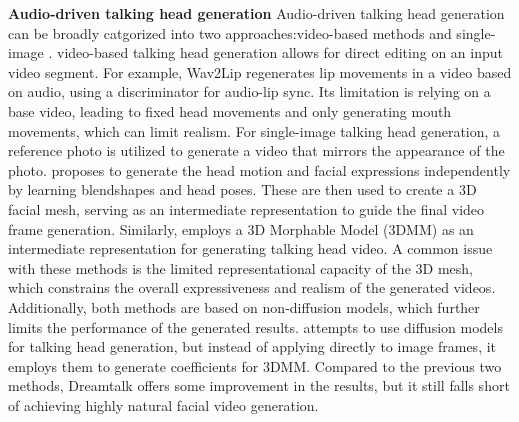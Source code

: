 \documentclass[runningheads]{llncs}
\begin{document}
\textbf{Audio-driven talking head generation}
Audio-driven talking head generation can be broadly catgorized into two approaches:video-based methods\cite{wen2020audiodvp,faceformer2022, wav2lip, shen2023difftalk, guan2023stylesync} and single-image \cite{sadtalker,sun2023vividtalk,dreamtalk, liu2023moda}.
video-based talking head generation allows for direct editing on an input video segment. For example, Wav2Lip\cite{wav2lip} regenerates lip movements in a video based on audio, using a discriminator for audio-lip sync. Its limitation is relying on a base video, leading to fixed head movements and only generating mouth movements, which can limit realism.
For single-image talking head generation, a reference photo is utilized to generate a video that mirrors the appearance of the photo. 
\cite{sun2023vividtalk} proposes to generate the head motion and facial expressions independently by learning blendshapes and head poses. These are then used to create a 3D facial mesh, serving as an intermediate representation to guide the final video frame generation. Similarly, \cite{sadtalker} employs a 3D Morphable Model (3DMM) as an intermediate representation for generating talking head video.
A common issue with these methods is the limited representational capacity of the 3D mesh, which constrains the overall expressiveness and realism of the generated videos. Additionally, both methods are based on non-diffusion models, which further limits the performance of the generated results. \cite{dreamtalk} attempts to use diffusion models for talking head generation, but instead of applying directly to image frames, it employs them to generate coefficients for 3DMM. Compared to the previous two methods, Dreamtalk offers some improvement in the results, but it still falls short of achieving highly natural facial video generation.






%
%


\end{document}
